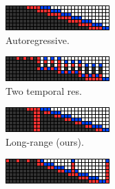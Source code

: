 \begin{figure}[t!]
    \centering
    \begin{subfigure}[t]{0.24\textwidth}
        \centering
        \includegraphics[width=\textwidth]{figs/fdm/unconditional-inference-modes/sample_vis_autoreg_T=30_sampling_3_out_of_7_red_blue_flipped.png}
        \caption{Autoregressive.} \label{fig:autoreg-vis}
    \end{subfigure}
    \begin{subfigure}[t]{0.24\textwidth}
        \centering
        \includegraphics[width=\textwidth]{figs/fdm/unconditional-inference-modes/sample_vis_baby-cond-ho-et-al-for-vis_T=30_sampling_3_out_of_7_red_blue_flipped.png}
        \caption{Two temporal res.} \label{fig:google-vis}
    \end{subfigure}
    \begin{subfigure}[t]{0.24\textwidth}
        \centering
        \includegraphics[width=\textwidth]{figs/fdm/unconditional-inference-modes/sample_vis_mixed-autoreg-independent_T=30_sampling_3_out_of_7_red_blue_flipped.png}
        \caption{Long-range (ours).} \label{fig:mixed-vis}
    \end{subfigure}
    \begin{subfigure}[t]{0.24\textwidth}
        \centering
        \includegraphics[width=\textwidth]{figs/fdm/unconditional-inference-modes/sample_vis_hierarchy-2_T=30_sampling_3_out_of_7_red_blue_flipped.png}

\end{subfigure}
\end{figure}
